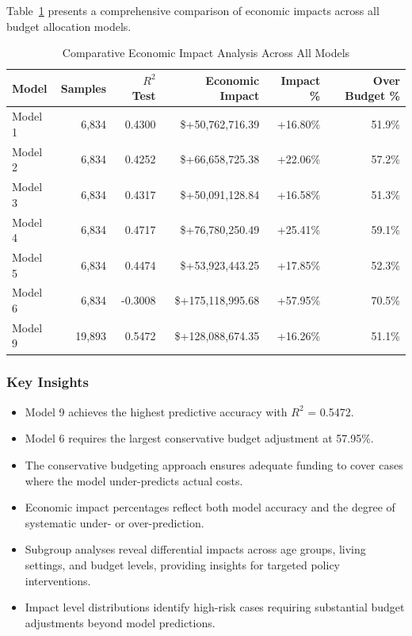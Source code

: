 Table~\ref{tab:all_models_impact_comparison} presents a comprehensive comparison of economic impacts across all budget allocation models.

\begin{table}[htbp]
\centering
\small
\caption{Comparative Economic Impact Analysis Across All Models}
\label{tab:all_models_impact_comparison}
\begin{tabular}{lrrrrr}
\toprule
\textbf{Model} & \textbf{Samples} & \textbf{$R^2$ Test} & \textbf{Economic Impact} & \textbf{Impact \%} & \textbf{Over Budget \%} \\
\midrule
Model 1 & 6,834 & 0.4300 & \$+50,762,716.39 & +16.80\% & 51.9\% \\
Model 2 & 6,834 & 0.4252 & \$+66,658,725.38 & +22.06\% & 57.2\% \\
Model 3 & 6,834 & 0.4317 & \$+50,091,128.84 & +16.58\% & 51.3\% \\
Model 4 & 6,834 & 0.4717 & \$+76,780,250.49 & +25.41\% & 59.1\% \\
Model 5 & 6,834 & 0.4474 & \$+53,923,443.25 & +17.85\% & 52.3\% \\
Model 6 & 6,834 & -0.3008 & \$+175,118,995.68 & +57.95\% & 70.5\% \\
Model 9 & 19,893 & 0.5472 & \$+128,088,674.35 & +16.26\% & 51.1\% \\
\bottomrule
\end{tabular}
\end{table}

\subsubsection{Key Insights}

\begin{itemize}
\item Model 9 achieves the highest predictive accuracy with $R^2$ = 0.5472.
\item Model 6 requires the largest conservative budget adjustment at 57.95\%.
\item The conservative budgeting approach ensures adequate funding to cover cases where the model under-predicts actual costs.
\item Economic impact percentages reflect both model accuracy and the degree of systematic under- or over-prediction.
\item Subgroup analyses reveal differential impacts across age groups, living settings, and budget levels, providing insights for targeted policy interventions.
\item Impact level distributions identify high-risk cases requiring substantial budget adjustments beyond model predictions.
\end{itemize}

